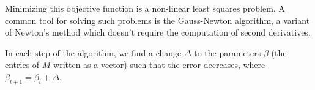 \documentclass[float=false, crop=false]{standalone}
\begin{document}
Minimizing this objective function is a non-linear least squares problem. A common tool for solving
such problems is the Gauss-Newton algorithm, a variant of Newton's method which doesn't require
the computation of second derivatives.

In each step of the algorithm, we find a change $\Delta$ to the parameters $\beta$ (the entries of $M$ written as
a vector) such that the error decreases, where $\beta_{t+1} = \beta_t + \Delta$.

\end{document}
